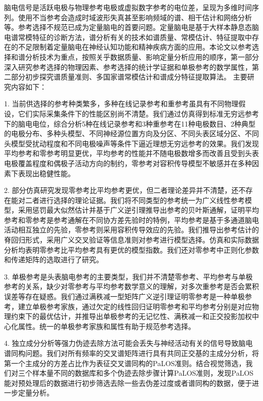 \begin{chineseabstract}
脑电信号是活跃电极与物理参考电极或虚拟数字参考的电位差，呈现为多维时间序列。使用不当参考会造成时域波形失真甚至影响频域的谱、相干估计和网络分析等。参考选择不规范已成为定量脑电的首要问题。定量脑电是基于大样本静息态脑电谱常模特征的诊断方法，谱分析有关的技术如谱质量、常模估计、特征提取中存在的不足限制着定量脑电在神经认知功能和精神疾病方面的应用。本论文以参考选择和谱分析技术为重点，按照关乎数据质量、影响定量分析应用的顺序，第一部分深入研究参考选择的物理因素、参考选择的统计学证据和单极参考的数学属性，第二部分初步探究谱质量准则、多国家谱常模估计和谱成分特征提取算法。
主要研究内容如下：

1. 当前供选择的参考种类繁多，多种在线记录参考和重参考虽具有不同物理假设，它们实际采集条件下的性能区别尚不清楚。我们通过仿真得到标准无穷远参考下的脑电电位，综合分析5种在线记录参考和3种重参考在11种电极数目、2种典型的电极分布、多种头模型、不同神经源位置方向及分区、不同头表区域分区、不同头模型受扰动程度和不同电极噪声等条件下逼近理想无穷远参考的效果。我们发现平均参考和零参考明显更优，平均参考的性能并不随电极数增多而改善且受到头表电极覆盖程度和偶极子活动方向的制约，零参考对容积传导模型不敏感并在多种因素下表现出稳健性能。

2. 部分仿真研究发现零参考比平均参考更优，但二者理论差异并不清楚，还不存在能对二者进行选择的理论证据。我们将不同类型的参考统一为广义线性参考模型，采用惩罚最大似然估计并基于广义逆引理推导出参考的贝叶斯通解，证明平均参考和零参考是参考通解在不同协方差先验时的特例，平均参考是基于多通道脑电活动相互独立的先验，零参考则采用容积传导效应的先验。我们推导出参考估计的脊回归形式，采用广义交叉验证等信息准则对参考进行模型选择。仿真和实际数据分析均表明零参考比平均参考具有更优的模型指数。我们还对零参考中正则化参数和传递矩阵的选取进行了研究。

3. 单极参考是头表脑电参考的主要类型，我们并不清楚零参考、平均参考与单极参考的关系，缺少对零参考与平均参考数学意义的理解，对多次重参考是否会累积误差等存在疑惑。我们通过满秩减一型矩阵广义逆引理证明零参考是一种单极参考，建立单极参考家族，通过欠定的线性回归证明零参考和平均参考分别是对应物理约束下的最优估计，并推导出单极参考的无记忆性、满秩减一和正交投影加权中心化属性。统一的单极参考家族和属性有助于规范参考选择。

4. 独立成分分析等强力伪迹去除方法可能会丢失与神经活动有关的信号导致脑电谱同构问题。我们对所有频率的交叉谱矩阵进行具有共同正交基的主成分分析，将第一个主成分的方差占比作为表征交叉谱同构的PaLOS准则。结合视觉筛选，我们对三个样本量不同的数据库和多个伪迹去除步骤计算PaLOS准则，发现PaLOS能对预处理后的数据进行初步筛选去除一些去伪差过度或者谱同构的数据，便于进一步定量分析。


\end{chineseabstract}
